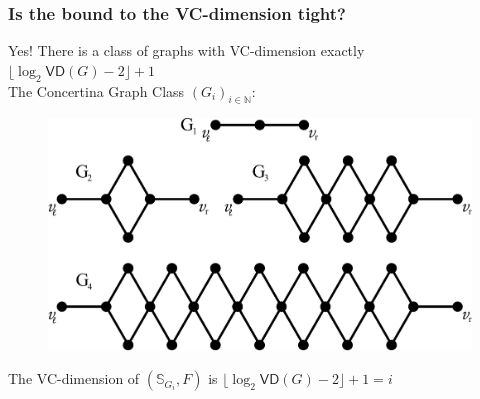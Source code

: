 \begin{frame}
  \frametitle{Is the bound to the VC-dimension tight?}
  Yes! There is a class of graphs with VC-dimension exactly
  $\lfloor\log_2\mathsf{VD}(G) -2\rfloor +1$\\
  \quad The Concertina Graph Class $(G_i)_{i\in\mathbb{N}}$:
  \begin{figure}[H]
    \centering
    \includegraphics[scale=0.3]{imgs/concertina.pdf}
  \end{figure}
  \vfill
  \begin{theorem}
   The VC-dimension of $(\mathbb{S}_{G_i}, F)$ is $\lfloor\log_2\mathsf{VD}(G)
   -2\rfloor +1=i$
  \end{theorem}
\end{frame}

%

